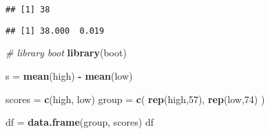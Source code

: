 \documentclass[
]{article}
\newenvironment{Shaded}{\begin{snugshade}}{\end{snugshade}}
\newcommand{\CommentTok}[1]{\textcolor[rgb]{0.56,0.35,0.01}{\textit{#1}}}
\newcommand{\DecValTok}[1]{\textcolor[rgb]{0.00,0.00,0.81}{#1}}
\newcommand{\FunctionTok}[1]{\textcolor[rgb]{0.13,0.29,0.53}{\textbf{#1}}}
\newcommand{\NormalTok}[1]{#1}
\newcommand{\OtherTok}[1]{\textcolor[rgb]{0.56,0.35,0.01}{#1}}
\newcommand{\SpecialCharTok}[1]{\textcolor[rgb]{0.81,0.36,0.00}{\textbf{#1}}}
\newcommand{\StringTok}[1]{\textcolor[rgb]{0.31,0.60,0.02}{#1}}
\begin{document}
\begin{verbatim}
## [1] 38
\end{verbatim}

\begin{Shaded}
\end{Shaded}

\begin{verbatim}
## [1] 38.000  0.019
\end{verbatim}

\begin{Shaded}
\begin{Highlighting}[]
\CommentTok{\# library boot}
\FunctionTok{library}\NormalTok{(boot)}

\NormalTok{s }\OtherTok{=} \FunctionTok{mean}\NormalTok{(high) }\SpecialCharTok{{-}} \FunctionTok{mean}\NormalTok{(low)}

\NormalTok{scores }\OtherTok{=} \FunctionTok{c}\NormalTok{(high, low)}
\NormalTok{group }\OtherTok{=} \FunctionTok{c}\NormalTok{(}
    \FunctionTok{rep}\NormalTok{(}\StringTok{\textquotesingle{}high\textquotesingle{}}\NormalTok{,}\DecValTok{57}\NormalTok{),}
    \FunctionTok{rep}\NormalTok{(}\StringTok{\textquotesingle{}low\textquotesingle{}}\NormalTok{,}\DecValTok{74}\NormalTok{)}
\NormalTok{)}

\NormalTok{df }\OtherTok{=} \FunctionTok{data.frame}\NormalTok{(group, scores)}
\NormalTok{df}
\end{Highlighting}
\end{Shaded}
\end{document}
